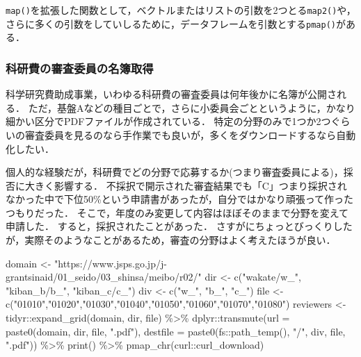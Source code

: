 \documentclass[
]{article}
\newenvironment{Shaded}{\begin{snugshade}}{\end{snugshade}}
\newcommand{\AttributeTok}[1]{\textcolor[rgb]{0.77,0.63,0.00}{#1}}
\newcommand{\FunctionTok}[1]{\textcolor[rgb]{0.00,0.00,0.00}{#1}}
\newcommand{\NormalTok}[1]{#1}
\newcommand{\OtherTok}[1]{\textcolor[rgb]{0.56,0.35,0.01}{#1}}
\newcommand{\SpecialCharTok}[1]{\textcolor[rgb]{0.00,0.00,0.00}{#1}}
\newcommand{\StringTok}[1]{\textcolor[rgb]{0.31,0.60,0.02}{#1}}
\begin{document}
\texttt{map()}を拡張した関数として，ベクトルまたはリストの引数を2つとる\texttt{map2()}や，さらに多くの引数をしていしるために，データフレームを引数とする\texttt{pmap()}がある．

\hypertarget{ux79d1ux7814ux8cbbux306eux5be9ux67fbux59d4ux54e1ux306eux540dux7c3fux53d6ux5f97}{%
\subsubsection{科研費の審査委員の名簿取得}\label{ux79d1ux7814ux8cbbux306eux5be9ux67fbux59d4ux54e1ux306eux540dux7c3fux53d6ux5f97}}

科学研究費助成事業，いわゆる科研費の審査委員は何年後かに名簿が公開される．
ただ，基盤Aなどの種目ごとで，さらに小委員会ごとというように，かなり細かい区分でPDFファイルが作成されている．
特定の分野のみで1つか2つぐらいの審査委員を見るのなら手作業でも良いが，多くをダウンロードするなら自動化したい．

個人的な経験だが，科研費でどの分野で応募するか(つまり審査委員による)，採否に大きく影響する．
不採択で開示された審査結果でも「C」つまり採択されなかった中で下位50\%という申請書があったが，自分ではかなり頑張って作ったつもりだった．
そこで，年度のみ変更して内容はほぼそのままで分野を変えて申請した．
すると，採択されたことがあった．
さすがにちょっとびっくりしたが，実際そのようなことがあるため，審査の分野はよく考えたほうが良い．

\begin{Shaded}
\begin{Highlighting}[]
\NormalTok{domain }\OtherTok{\textless{}{-}} \StringTok{"https://www.jsps.go.jp/j{-}grantsinaid/01\_seido/03\_shinsa/meibo/r02/"}
\NormalTok{dir }\OtherTok{\textless{}{-}} \FunctionTok{c}\NormalTok{(}\StringTok{"wakate/w\_"}\NormalTok{, }\StringTok{"kiban\_b/b\_"}\NormalTok{, }\StringTok{"kiban\_c/c\_"}\NormalTok{)}
\NormalTok{div }\OtherTok{\textless{}{-}} \FunctionTok{c}\NormalTok{(}\StringTok{"w\_"}\NormalTok{, }\StringTok{"b\_"}\NormalTok{, }\StringTok{"c\_"}\NormalTok{)}
\NormalTok{file }\OtherTok{\textless{}{-}} \FunctionTok{c}\NormalTok{(}\StringTok{"01010"}\NormalTok{,}\StringTok{"01020"}\NormalTok{,}\StringTok{"01030"}\NormalTok{,}\StringTok{"01040"}\NormalTok{,}\StringTok{"01050"}\NormalTok{,}\StringTok{"01060"}\NormalTok{,}\StringTok{"01070"}\NormalTok{,}\StringTok{"01080"}\NormalTok{)}
\NormalTok{reviewers }\OtherTok{\textless{}{-}}
\NormalTok{  tidyr}\SpecialCharTok{::}\FunctionTok{expand\_grid}\NormalTok{(domain, dir, file) }\SpecialCharTok{\%\textgreater{}\%}
\NormalTok{  dplyr}\SpecialCharTok{::}\FunctionTok{transmute}\NormalTok{(}\AttributeTok{url =} \FunctionTok{paste0}\NormalTok{(domain, dir, file, }\StringTok{".pdf"}\NormalTok{), }
                   \AttributeTok{destfile =} \FunctionTok{paste0}\NormalTok{(fs}\SpecialCharTok{::}\FunctionTok{path\_temp}\NormalTok{(), }\StringTok{"/"}\NormalTok{, div, file, }\StringTok{".pdf"}\NormalTok{)) }\SpecialCharTok{\%\textgreater{}\%}
  \FunctionTok{print}\NormalTok{() }\SpecialCharTok{\%\textgreater{}\%}
  \FunctionTok{pmap\_chr}\NormalTok{(curl}\SpecialCharTok{::}\NormalTok{curl\_download)}
\end{Highlighting}
\end{Shaded}
\end{document}
